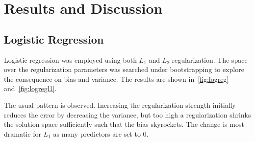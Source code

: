 \section{Results and Discussion}\label{sec:Discussion}

\subsection{Logistic Regression}

Logistic regression was employed using both $L_1$ and $L_2$ regularization. The space over the regularization parameters
was searched under bootstrapping to explore the consequence on bias and variance. The results are shown in~\cref{fig:logreg} and~\cref{fig:logregl1}.

The usual pattern is observed. Increasing the regularization strength initially
reduces the error by decreasing the variance, but too high a regularization shrinks
the solution space sufficiently such that the bias skyrockets. The change is most dramatic for $L_1$ as many predictors are set to $0$.

